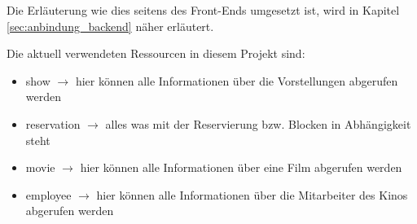 Die Erläuterung wie dies seitens des Front-Ends umgesetzt ist, wird in Kapitel \vref{sec:anbindung_backend} näher erläutert.
 

Die aktuell verwendeten Ressourcen in diesem Projekt sind:
\begin{itemize}
	\item show $\rightarrow$ hier können alle Informationen über die Vorstellungen abgerufen werden
	\item reservation $\rightarrow$ alles was mit der Reservierung bzw. Blocken in Abhängigkeit steht 
	\item movie $\rightarrow$ hier können alle Informationen über eine Film abgerufen werden
	\item employee $\rightarrow$ hier können alle Informationen über die Mitarbeiter des Kinos abgerufen werden
\end{itemize} 